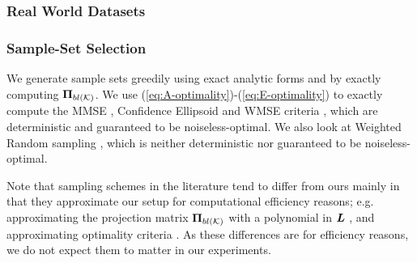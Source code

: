 \subsubsection{Real World Datasets}


\subsubsection{Sample-Set Selection}

We generate sample sets greedily using exact analytic forms and by exactly computing $\bm{\Pi}_{bl(\mathcal{K})}$. We use (\ref{eq:A-optimality})-(\ref{eq:E-optimality}) to exactly compute the MMSE {\color{black}\cite{wang2018optimal,wang2019low, mfn}}, Confidence Ellipsoid {\color{black}\cite{jayawant2021doptimal, tremblay2017determinantal,mfn}} and WMSE criteria {\color{black} \cite{bai2020fast}}, which are deterministic and guaranteed to be noiseless-optimal.  We also look at Weighted Random sampling \cite{puy2018random}, which is neither deterministic nor guaranteed to be noiseless-optimal.

Note that sampling schemes in the literature tend to differ from ours mainly in that they approximate our setup for computational efficiency reasons; e.g. approximating the projection matrix $\projbl$ with a polynomial in $\bm{L}$ \cite{wang2018optimal}, and approximating optimality criteria \cite{bai2020fast}. As these differences are for efficiency reasons, we do not expect them to matter in our experiments.

